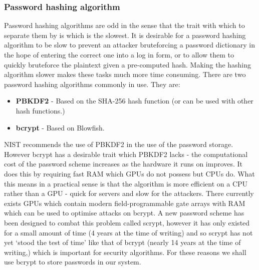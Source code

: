\documentclass[12pt, titlepage]{article}
\begin{document}
\subsubsection{Password hashing algorithm}
Password hashing algorithms are odd in the sense that the trait with which to separate them by is which is the slowest. It is desirable for a password hashing algorithm to be slow to prevent an attacker bruteforcing a password dictionary in the hope of entering the correct one into a log in form, or to allow them to quickly bruteforce the plaintext given a pre-computed hash. Making the hashing algorithm slower makes these tasks much more time consuming.
\newline There are two password hashing algorithms commonly in use. They are:
\begin{itemize}
	\item \textbf{PBKDF2} - Based on the SHA-256 hash function (or can be used with other hash functions.)
	\item \textbf{bcrypt} - Based on Blowfish.
\end{itemize}
NIST recommends the use of PBKDF2 in the use of the password storage.\cite{nistPassword} However bcrypt has a desirable trait which PBKDF2 lacks - the computational cost of the password scheme increases as the hardware it runs on improves. It does this by requiring fast RAM which GPUs do not possess but CPUs do.\cite{bcryptPaper} What this means in a practical sense is that the algorithm is more efficient on a CPU rather than a GPU - quick for servers and slow for the attackers.
\newline \indent There currently exists GPUs which contain modern field-programmable gate arrays with RAM which can be used to optimise attacks on bcrypt. A new password scheme has been designed to combat this problem called scrypt\cite{scrypt}, however it has only existed for a small amount of time (4 years at the time of writing) and so scrypt has not yet `stood the test of time' like that of bcrypt (nearly 14 years at the time of writing,) which is important for security algorithms.
\newline \indent For these reasons we shall use bcrypt to store passwords in our system.
\newline 
\end{document}
